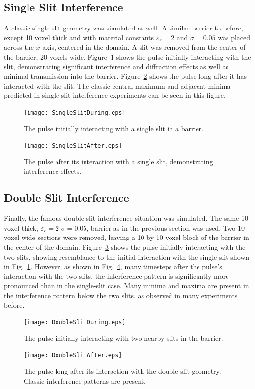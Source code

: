 \documentclass[12pt,twocolumn]{article}
\begin{document}
\subsection{Single Slit Interference}
A classic single slit geometry was simulated as well. A similar barrier to before, except 10 voxel thick and with material constants $\varepsilon_r=2$ and $\sigma=0.05$ was placed across the $x$-axis, centered in the domain. A slit was removed from the center of the barrier, 20 voxels wide. Figure~\ref{fig:SingleSlitDuring} shows the pulse initially interacting with the slit, demonstrating significant interference and diffraction effects as well as minimal transmission into the barrier. Figure~\ref{fig:SingleSlitAfter} shows the pulse long after it has interacted with the slit. The classic central maximum and adjacent minima predicted in single slit interference experiments can be seen in this figure.
\begin{figure}
\centering
\texttt{[image: SingleSlitDuring.eps]}
\caption{The pulse initially interacting with a single slit in a barrier.}
\label{fig:SingleSlitDuring}
\end{figure}
\begin{figure}
\centering
\texttt{[image: SingleSlitAfter.eps]}
\caption{The pulse after its interaction with a single slit, demonstrating interference effects.}
\label{fig:SingleSlitAfter}
\end{figure}
\subsection{Double Slit Interference}
Finally, the famous double slit interference situation was simulated. The same 10 voxel thick, $\varepsilon_r=2$ $\sigma=0.05$, barrier as in the previous section was used. Two 10 voxel wide sections were removed, leaving a 10 by 10 voxel block of the barrier in the center of the domain. Figure~\ref{fig:DoubleSlitDuring} shows the pulse initially interacting with the two slits, showing resemblance to the initial interaction with the single slit shown in Fig.~\ref{fig:SingleSlitDuring}. However, as shown in Fig.~\ref{fig:DoubleSlitAfter}, many timesteps after the pulse's interaction with the two slits, the interference pattern is significantly more pronounced than in the single-slit case. Many minima and maxima are present in the interference pattern below the two slits, as observed in many experiments before.
\begin{figure}
\centering
\texttt{[image: DoubleSlitDuring.eps]}
\caption{The pulse initially interacting with two nearby slits in the barrier.}
\label{fig:DoubleSlitDuring}
\end{figure}
\begin{figure}
\centering
\texttt{[image: DoubleSlitAfter.eps]}
\caption{The pulse long after its interaction with the double-slit geometry. Classic interference patterns are present.}
\label{fig:DoubleSlitAfter}
\end{figure}
\end{document}

